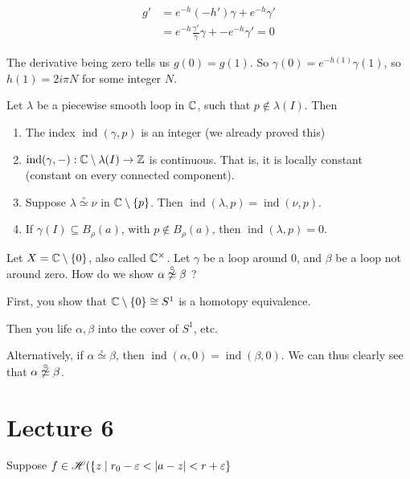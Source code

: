 \documentclass[x11names,reqno,14pt]{extarticle}
\DeclareMathOperator{\ind}{ind}
\begin{document}
\begin{align*}
g' & = e^{-h}(-h')\gamma + e^{-h}\gamma'\\
& = e^{-h}\frac{\gamma'}{\gamma}\gamma + -e^{-h}\gamma' = 0
\end{align*}

The derivative being zero tells us $g(0) = g(1)$. So $\gamma(0) = e^{-h(1)}\gamma(1)$, so $h(1) = 2i \pi N$ for some integer $N$. 

\thm

Let $\lambda$ be a piecewise smooth loop in $\mathbb{C}$, such that $p \not\in\lambda(I)$. Then
\begin{enumerate}
\item The index $\operatorname{ind}(\gamma, p)$ is an integer (we already proved this)
\item $\operatorname{ind}(\gamma, -):\mathbb{C}\setminus\lambda(I)\to\mathbb{Z}$ is continuous. That is, it is locally constant (constant on every connected component).  
\item Suppose $\lambda\overset{\circ}{\simeq} \nu$ in $\mathbb{C}\setminus\{p\}$. Then $\operatorname{ind}(\lambda, p) = \operatorname{ind}(\nu, p)$.
\item If $\gamma(I) \subseteq B_\rho(a)$, with $p\not\in B_\rho(a)$, then $\ind(\lambda,p) = 0$.
\end{enumerate}

Let $X = \mathbb{C}\setminus\{0\}$, also called $\mathbb{C}^\times$. Let $\gamma$ be a loop around 0, and $\beta$ be a loop not around zero. How do we show $\alpha\not\overset{\circ}{\simeq}\beta$ ?

First, you show that $\mathbb{C}\setminus\{0\} \cong S^1$ is a homotopy equivalence. 

Then you life $\alpha,\beta$ into the cover of $S^1$, etc. 

Alternatively, if $\alpha\overset{\circ}{\simeq}\beta$, then $\ind(\alpha,0) = \ind(\beta,0)$. We can thus clearly see that $\alpha\not\overset{\circ}{\simeq}\beta$. 

\section*{Lecture 6}

\thm

Suppose $f \in \mathscr{H}(\{z \mid r_0 - \varepsilon<  |a - z| < r + \varepsilon\}$
\end{document}
